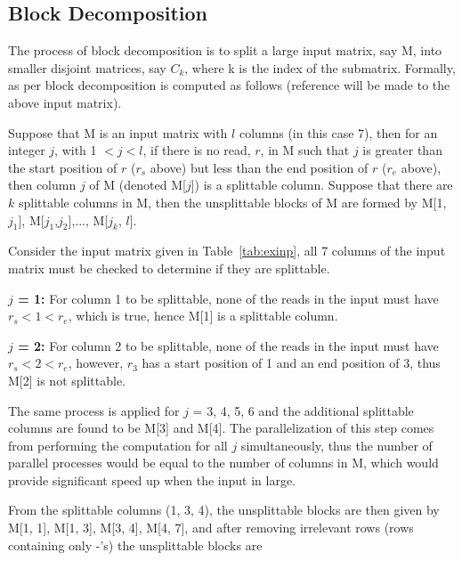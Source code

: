 \documentclass[10pt,twocolumn]{article}
\begin{document}
\subsection{Block Decomposition}

The process of block decomposition is to split a large input matrix, say M, into smaller disjoint matrices,
say $C_k$, where k is the index of the submatrix. Formally, as per \cite{chenapp:2013} block decomposition is
computed as follows (reference will be made to the above input matrix).

Suppose that M is an input matrix with $l$ columns (in this case 7), then for an integer $j$, with 1 $< j <
l$, if there is no read, $r$, in M such that $j$ is greater than the start position of $r$ ($r_s$ above) but
less than the end position of $r$ ($r_e$ above), then column $j$ of M (denoted M[$j$]) is a splittable column.
Suppose that there are $k$ splittable columns in M, then the unsplittable blocks of M are formed by M[1,
$j_1$], M[$j_1$,$j_2$],..., M[$j_k$, $l$]. 

Consider the input matrix given in Table~\ref{tab:exinp}, all 7 columns of the input matrix must be checked to
determine if they are splittable. 

\textbf{$j$ = 1:} For column 1 to be splittable, none of the reads in the input must have $r_s < 1 < r_e$,
which is true, hence M[1] is a splittable column.

\textbf{$j$ = 2:} For column 2 to be splittable, none of the reads in the input must have $r_s < 2 < r_e$,
however, $r_3$ has a start position of 1 and an end position of 3, thus M[2] is not splittable.

The same process is applied for $j$ = 3, 4, 5, 6 and the additional splittable columns are found to be M[3] and M[4]. The
parallelization of this step comes from performing the computation for all $j$ simultaneously, thus the number
of parallel processes would be equal to the number of columns in M, which would provide significant speed up
when the input in large.

From the splittable columns (1, 3, 4), the unsplittable blocks are then given by M[1, 1], M[1, 3], M[3, 4], M[4,
7], and after removing irrelevant rows (rows containing only -'s) the unsplittable blocks are
\end{document}
